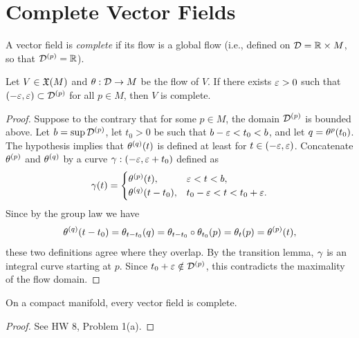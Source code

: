 \section{Complete Vector Fields}
A vector field is \textit{complete} if its flow is a global flow (i.e., defined on $\mathcal{D} = \mathbb{R} \times M$, so that $\mathcal{D}^{(p)} = \mathbb{R}$). 
\begin{lemma}\label{9.15} %
    Let $V \in \frak{X}(M)$ and $\theta:\mathcal{D} \to M$ be the flow of $V$. If there exists $\varepsilon>0$ such that $(-\varepsilon, \varepsilon) \subset \mathcal{D}^{(p)}$ for all $p \in M$, then $V$ is complete. 
\end{lemma}
\begin{proof}
    Suppose to the contrary that for some $p \in M$, the domain $\mathcal{D}^{(p)}$ is bounded above. Let $b = \sup \mathcal{D}^{(p)}$, let $t_0>0$ be such that $b-\varepsilon < t_0 < b$, and let $q = \theta^{p}(t_0)$. The hypothesis implies that $\theta^{(q)}(t)$ is defined at least for $t \in (-\varepsilon, \varepsilon)$. Concatenate $\theta^{(p)}$ and $\theta^{(q)}$ by a curve $\gamma:(-\varepsilon, \varepsilon+t_0)$ defined as 
    $$ \gamma(t) = \begin{cases}
        \theta^{(p)}(t), & \varepsilon<t<b, \\
        \theta^{(q)}(t-t_0), & t_0-\varepsilon < t < t_0+\varepsilon. \end{cases}$$
    Since by the group law we have 
    $$\theta^{(q)}(t-t_0) = \theta_{t-t_0}(q) = \theta_{t-t_0}\circ \theta_{t_0}(p) = \theta_t(p) = \theta^{(p)}(t), $$
    these two definitions agree where they overlap. By the transition lemma, $\gamma$ is an integral curve starting at $p$. Since $t_0+\varepsilon \notin \mathcal{D}^{(p)}$, this contradicts the maximality of the flow domain.  

\end{proof}
\begin{corollary} %
    On a compact manifold, every vector field is complete. 
\end{corollary}
\begin{proof}
    See HW 8, Problem 1(a).    
\end{proof}

